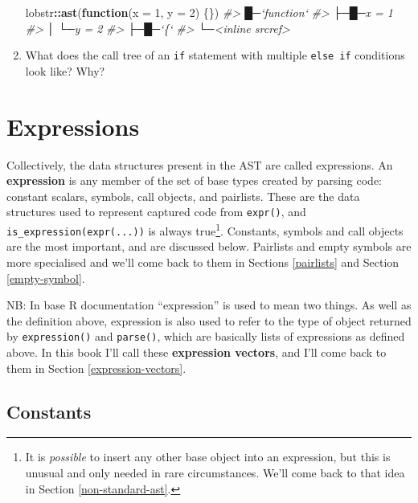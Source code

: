 \documentclass[]{book}
\makeatletter
\newenvironment{Shaded}{\begin{snugshade}}{\end{snugshade}}
\newcommand{\CommentTok}[1]{\textcolor[rgb]{0.37,0.37,0.37}{\textit{#1}}}
\newcommand{\ControlFlowTok}[1]{\textcolor[rgb]{0.27,0.27,0.27}{\textbf{#1}}}
\newcommand{\DataTypeTok}[1]{\textcolor[rgb]{0.27,0.27,0.27}{#1}}
\newcommand{\DecValTok}[1]{\textcolor[rgb]{0.06,0.06,0.06}{#1}}
\newcommand{\KeywordTok}[1]{\textcolor[rgb]{0.27,0.27,0.27}{\textbf{#1}}}
\newcommand{\NormalTok}[1]{#1}
\newcommand{\OperatorTok}[1]{\textcolor[rgb]{0.43,0.43,0.43}{\textbf{#1}}}
\let\rmarkdownfootnote\footnote%
\def\footnote{\protect\rmarkdownfootnote}
\newcommand{\indexc}[1]{\index{#1@\texttt{#1}}}
\makeatother
\begin{document}
\begin{enumerate}
\begin{Shaded}
\begin{Highlighting}[]
\NormalTok{lobstr}\OperatorTok{::}\KeywordTok{ast}\NormalTok{(}\ControlFlowTok{function}\NormalTok{(}\DataTypeTok{x =} \DecValTok{1}\NormalTok{, }\DataTypeTok{y =} \DecValTok{2}\NormalTok{) \{\})}
\CommentTok{#> █─`function` }
\CommentTok{#> ├─█─x = 1 }
\CommentTok{#> │ └─y = 2 }
\CommentTok{#> ├─█─`\{` }
\CommentTok{#> └─<inline srcref>}
\end{Highlighting}
\end{Shaded}
\item
  What does the call tree of an \texttt{if} statement with multiple \texttt{else\ if}
  conditions look like? Why?
\end{enumerate}

\hypertarget{expression-details}{%
\section{Expressions}\label{expression-details}}

\indexc{expr()}

Collectively, the data structures present in the AST are called expressions. An \textbf{expression} is any member of the set of base types created by parsing code: constant scalars, symbols, call objects, and pairlists. These are the data structures used to represent captured code from \texttt{expr()}, and \texttt{is\_expression(expr(...))} is always true\footnote{It is \emph{possible} to insert any other base object into an expression, but this is unusual and only needed in rare circumstances. We'll come back to that idea in Section \ref{non-standard-ast}.}. Constants, symbols and call objects are the most important, and are discussed below. Pairlists and empty symbols are more specialised and we'll come back to them in Sections \ref{pairlists} and Section \ref{empty-symbol}.

NB: In base R documentation ``expression'' is used to mean two things. As well as the definition above, expression is also used to refer to the type of object returned by \texttt{expression()} and \texttt{parse()}, which are basically lists of expressions as defined above. In this book I'll call these \textbf{expression vectors}, and I'll come back to them in Section \ref{expression-vectors}.

\hypertarget{constants}{%
\subsection{Constants}\label{constants}}
\end{document}
